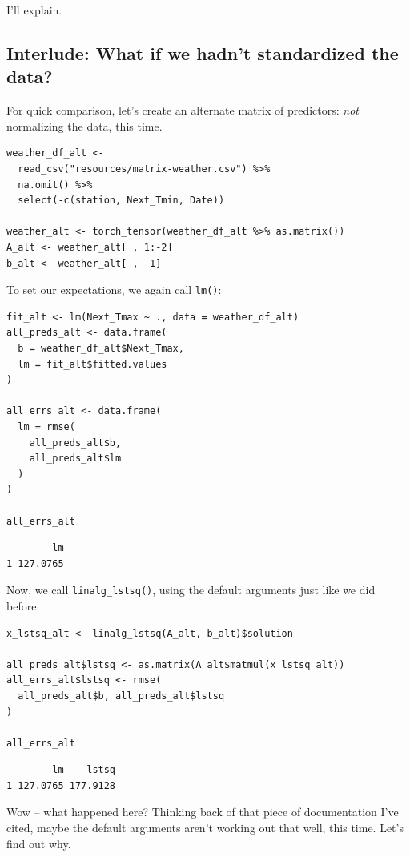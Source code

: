 \documentclass[
  letterpaper,
]{krantz}
\begin{document}
I'll explain.

\hypertarget{interlude-what-if-we-hadnt-standardized-the-data}{%
\subsection{Interlude: What if we hadn't standardized the
data?}\label{interlude-what-if-we-hadnt-standardized-the-data}}

For quick comparison, let's create an alternate matrix of predictors:
\emph{not} normalizing the data, this time.

\begin{verbatim}
weather_df_alt <- 
  read_csv("resources/matrix-weather.csv") %>% 
  na.omit() %>%
  select(-c(station, Next_Tmin, Date)) 

weather_alt <- torch_tensor(weather_df_alt %>% as.matrix())
A_alt <- weather_alt[ , 1:-2]
b_alt <- weather_alt[ , -1]
\end{verbatim}

To set our expectations, we again call \texttt{lm()}:

\begin{verbatim}
fit_alt <- lm(Next_Tmax ~ ., data = weather_df_alt)
all_preds_alt <- data.frame(
  b = weather_df_alt$Next_Tmax,
  lm = fit_alt$fitted.values
)

all_errs_alt <- data.frame(
  lm = rmse(
    all_preds_alt$b,
    all_preds_alt$lm
  )
)

all_errs_alt
\end{verbatim}

\begin{verbatim}
        lm
1 127.0765
\end{verbatim}

Now, we call \texttt{linalg\_lstsq()}, using the default arguments just
like we did before.

\begin{verbatim}
x_lstsq_alt <- linalg_lstsq(A_alt, b_alt)$solution

all_preds_alt$lstsq <- as.matrix(A_alt$matmul(x_lstsq_alt))
all_errs_alt$lstsq <- rmse(
  all_preds_alt$b, all_preds_alt$lstsq
)

all_errs_alt
\end{verbatim}

\begin{verbatim}
        lm    lstsq
1 127.0765 177.9128
\end{verbatim}

Wow -- what happened here? Thinking back of that piece of documentation
I've cited, maybe the default arguments aren't working out that well,
this time. Let's find out why.
\end{document}
